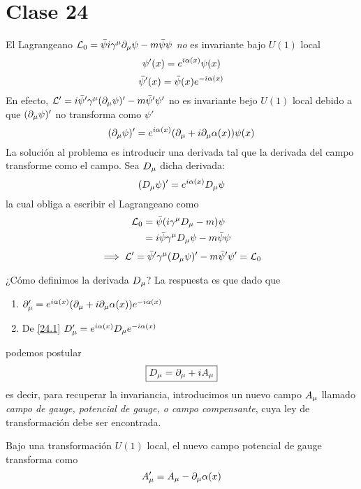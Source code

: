 \section{Clase 24}
El Lagrangeano $\mathcal{L}_0=\bar{\psi}i\gamma^\mu \partial_\mu \psi-m\bar{\psi}\psi$ \textit{no} es invariante bajo $U(1)$ local
\begin{equation}
  \psi'(x)=e^{i\alpha(x)}\psi(x)
\end{equation}
\begin{equation}
  \bar{\psi}'(x)=\bar{\psi}(x)e^{-i\alpha(x)}
\end{equation}
En efecto,
$\mathcal{L}'=i\bar{\psi}'\gamma^\mu (\partial_\mu \psi)'-m\bar{\psi}'\psi'$ no es invariante bejo $U(1)$ local debido a que $(\partial_\mu \psi)'$ no transforma como $\psi'$
\begin{equation}
  (\partial_\mu \psi)'=e^{i\alpha(x)}(\partial_\mu +i\partial_\mu \alpha(x))\psi(x)
\end{equation}
La solución al problema es introducir una derivada tal que la derivada del campo transforme como el campo. Sea $D_\mu $ dicha derivada:
\begin{equation}\label{24.1}
  (D_\mu \psi)'=e^{i\alpha(x)}D_\mu \psi
\end{equation}
la cual obliga a escribir el Lagrangeano como
\begin{align}
  \mathcal{L}_0&=\bar{\psi}(i\gamma^\mu D_\mu -m)\psi\\
  &=i\bar{\psi}\gamma^\mu D_\mu \psi-m\bar{\psi}\psi
\end{align}
\begin{equation}
  \implies \mathcal{L}'=\bar{\psi}'\gamma^\mu (D_\mu\psi)'-m\bar{\psi}'\psi'=\mathcal{L}_0
\end{equation}

¿Cómo definimos la derivada $D_\mu $? La respuesta es que dado que
\begin{enumerate}
	\item $\partial_\mu '=e^{i\alpha(x)}(\partial_\mu +i\partial_\mu \alpha(x))e^{-i\alpha(x)}$
	\item De \eqref{24.1} $D_\mu '=e^{i\alpha(x)}D_\mu e^{-i\alpha(x)}$
\end{enumerate}
podemos postular
\begin{equation}
  \boxed{D_\mu =\partial_\mu +iA_\mu }
\end{equation}
es decir, para recuperar la invariancia, introducimos un nuevo campo $A_\mu$ llamado \textit{campo de gauge, potencial de gauge, o campo compensante}, cuya ley de transformación debe ser encontrada.

\begin{teor}
	Bajo una transformación $U(1)$ local, el nuevo campo potencial de gauge transforma como
	\begin{equation}
  A_\mu '=A_\mu -\partial_\mu \alpha(x)
\end{equation}
\end{teor}


